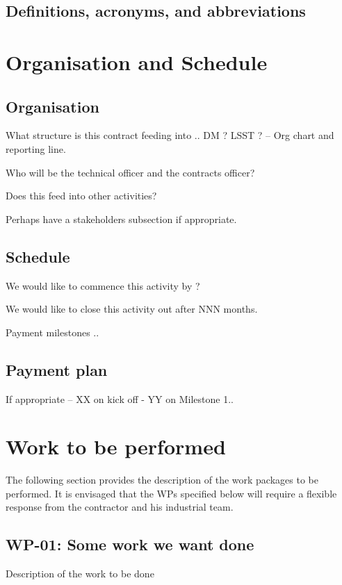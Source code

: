 \renewcommand{\refname}{}



\subsection{Definitions, acronyms, and abbreviations \label{sect:acronyms}} 


\section{Organisation and Schedule }


\subsection{Organisation}
What structure is this contract feeding into .. DM ? LSST ? -- Org chart and reporting line.

Who will be the technical officer and the contracts officer?

Does this feed into other activities?

Perhaps have a stakeholders subsection if appropriate.

\subsection{Schedule}
We would like to commence this activity by ?

We would like to close this activity out after NNN months.

Payment milestones ..

\subsection{Payment plan}
If appropriate -- XX on kick off - YY on Milestone 1..

\section{Work to be performed} \label{sect:wps}
The following section provides the description of the work packages to be performed. It is envisaged that the
WPs specified below will require a flexible response from the contractor and his industrial team.

\subsection{{\bf WP-01:} Some work we want done \label{wp1}}
Description of the work to be done

